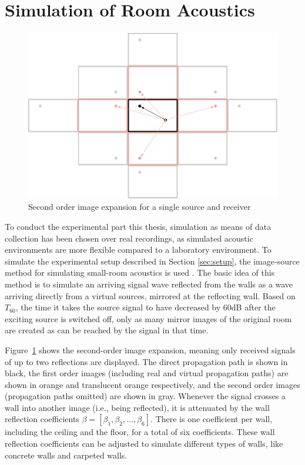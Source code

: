 \section{Simulation of Room Acoustics}
\label{sec:simulation}

\begin{figure}[!htp]
\centering
    \includegraphics[scale=0.7]{data/figures/image-method2}
    \caption{Second order image expansion for a single source and receiver}
    \label{fig:imageMethod}
\end{figure}

To conduct the experimental part this thesis, simulation as means of data collection has been chosen over real recordings, as simulated acoustic environments are more flexible compared to a laboratory environment. To simulate the experimental setup  described in Section \ref{sec:setup}, the image-source method for simulating small-room acoustics is used \cite{Allen1979}. The basic idea of this method is to simulate an arriving signal wave reflected from the walls as a wave arriving directly from a virtual sources, mirrored at the reflecting wall. Based on $T_{60}$, the time it takes the source signal to have decreased by 60dB after the exciting source is switched off, only as many mirror images of the original room are created as can be reached by the signal in that time.

Figure~\ref{fig:imageMethod} shows the second-order image expansion, meaning only received signals of up to two reflections are displayed. The direct propagation path is shown in black, the first order images (including real and virtual propagation paths) are shown in orange and translucent orange respectively, and the second order images (propagation paths omitted) are shown in gray. Whenever the signal crosses a wall into another image (i.e., being reflected), it is attenuated by the wall reflection coefficients $\beta = [\beta_1, \beta_2,\dots,\beta_6]$. There is one coefficient per wall, including the ceiling and the floor, for a total of six coefficients. These wall reflection coefficients can be adjusted to simulate different types of walls, like concrete walls and carpeted walls.

